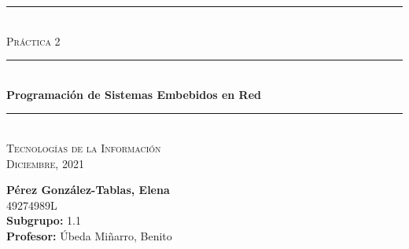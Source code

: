 \begin{titlepage}
	\begin{center}
		\rule{15cm}{0pt} \\
		[3cm]
		\textsc{\Large Práctica 2} \\
		\rule{15cm}{1pt} \\
		[0.25cm]
		\huge{\bfseries Programación de Sistemas Embebidos en Red} \\
		\rule{15cm}{1pt} \\
		\textsc{\Large Tecnologías de la Información} \\
		[0.25cm]
		\textsc{\Large Diciembre, 2021}\\
		[9cm]
	\end{center}
	\begin{flushright}
		\textbf{Pérez González-Tablas, Elena} \\
		[0.25cm]
		49274989L \\
		[0.25cm]
		\textbf{Subgrupo:} 1.1 \\
		[0.25cm]
		\textbf{Profesor:} Úbeda Miñarro, Benito\\
	\end{flushright}
\end{titlepage}
\newpage
\begin{titlepage}
	\begin{flushleft}
	\end{flushleft}
\end{titlepage}
